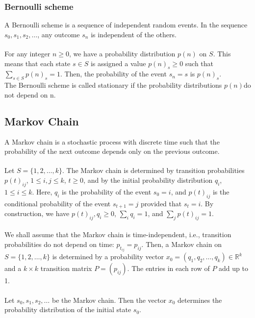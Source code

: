 \documentclass[12pt]{article}
\begin{document}
\subsubsection{Bernoulli scheme}
A Bernoulli scheme is a sequence of independent random events. In the sequence $s_0, s_1, s_2, \ldots$, any outcome $s_n$ is independent of the others.\\\\
For any integer $n \geq 0$, we have a probability distribution $p(n)$ on $S$. This means that each state $s \in S$ is assigned a value $p(n)_s \geq 0$ such that $\sum_{s \in S} p(n)_s = 1$. Then, the probability of the event $s_n = s$ is $p(n)_s$.\\
The Bernoulli scheme is called stationary if the
probability distributions $p
(n) $do not depend on n.

\subsection{Markov Chain}
A Markov chain is a stochastic process with discrete time such that the probability of the next outcome depends only on the previous outcome.\\\\
Let $S = \{1, 2, \ldots, k\}$. The Markov chain is determined by transition probabilities $p(t)_{ij}$, $1 \leq i, j \leq k$, $t \geq 0$, and by the initial probability distribution $q_i$, $1 \leq i \leq k$.
Here, $q_i$ is the probability of the event $s_0 = i$, and $p(t)_{ij}$ is the conditional probability of the event $s_{t+1} = j$ provided that $s_t = i$. By construction, we have $p(t)_{ij}, q_i \geq 0$, $\sum_i q_i = 1$, and $\sum_j p(t)_{ij} = 1$.\\\\
We shall assume that the Markov chain is time-independent, i.e., transition probabilities do not depend on time: $p_{t_{ij}} = p_{ij}$. Then, a Markov chain on $S = \{1, 2, \ldots, k\}$ is determined by a probability vector $x_0 = (q_1, q_2, \ldots, q_k) \in \mathbb{R}^k$ and a $k \times k$ transition matrix $P = (p_{ij})$. The entries in each row of $P$ add up to 1.\\\\
Let $s_0, s_1, s_2, \ldots$ be the Markov chain. Then the vector $x_0$ determines the probability distribution of the initial state $s_0$.
\end{document}
